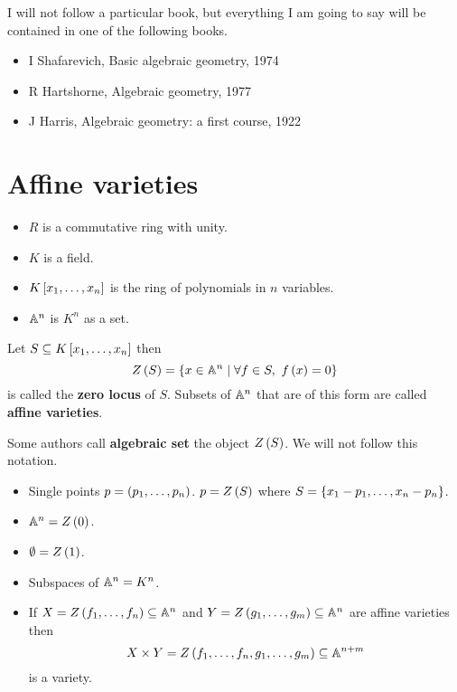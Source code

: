 I will not follow a particular book, but everything I am going to say will be contained in one of the following books.
\begin{itemize}
\item I Shafarevich, Basic algebraic geometry, 1974
\item R Hartshorne, Algebraic geometry, 1977
\item J Harris, Algebraic geometry: a first course, 1922
\end{itemize}

\pagebreak

\section{Affine varieties}

\begin{notation}
\hfill
\begin{itemize}
\item $ R $ is a commutative ring with unity.
\item $ K $ is a field.
\item $ K\sb{x_1, \dots, x_n} $ is the ring of polynomials in $ n $ variables.
\item $ \A^n $ is $ K^n $ as a set.
\end{itemize}
\end{notation}

\begin{definition}
Let $ S \subseteq K\sb{x_1, \dots, x_n} $ then
$$ Z\rb{S} = \cb{x \in \A^n \mid \forall f \in S, \ f\rb{x} = 0} $$
is called the \textbf{zero locus} of $ S $. Subsets of $ \A^n $ that are of this form are called \textbf{affine varieties}.
\end{definition}

\begin{remark}
Some authors call \textbf{algebraic set} the object $ Z\rb{S} $. We will not follow this notation.
\end{remark}

\begin{example}
\hfill
\begin{itemize}
\item Single points $ p = \rb{p_1, \dots, p_n} $. $ p = Z\rb{S} $ where $ S = \cb{x_1 - p_1, \dots, x_n - p_n} $.
\item $ \A^n = Z\rb{0} $.
\item $ \emptyset = Z\rb{1} $.
\item Subspaces of $ \A^n = K^n $.
\item If $ X = Z\rb{f_1, \dots, f_n} \subseteq \A^n $ and $ Y = Z\rb{g_1, \dots, g_m} \subseteq \A^n $ are affine varieties then
$$ X \times Y = Z\rb{f_1, \dots, f_n, g_1, \dots, g_m} \subseteq \A^{n + m} $$
is a variety.
\end{itemize}
\end{example}

